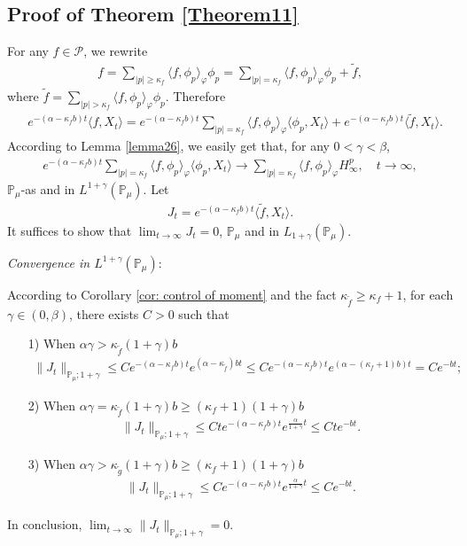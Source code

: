 \documentclass[12pt,oneside,english]{amsart}
\theoremstyle{plain}
\theoremstyle{definition}
\numberwithin{equation}{section}
\begin{document}
\subsection{Proof of Theorem \ref{Theorem11}}
For any $f\in \mathcal{P}$, we rewrite 
\begin{align}
    f=\sum_{|p|\geq \kappa_f}\langle f,\phi_p\rangle_\varphi \phi_p=\sum_{|p|= \kappa_f}\langle f,\phi_p\rangle_\varphi \phi_p+\tilde{f},
\end{align}
where $\tilde{f}=\sum_{|p|> \kappa_f}\langle f,\phi_p\rangle_\varphi \phi_p$. Therefore
\begin{align*}
    &e^{-(\alpha-\kappa_fb)t}\langle f,X_t\rangle=
    e^{-(\alpha-\kappa_fb)t}\sum_{|p|= \kappa_f}\langle f,\phi_p\rangle_\varphi \langle \phi_p,X_t\rangle+e^{-(\alpha-\kappa_fb)t} \langle \tilde{f},X_t\rangle.
\end{align*}
According to Lemma \ref{lemma26}, we easily get that,  for any $0< \gamma<\beta$,
\begin{align}\label{as convergence}
     e^{-(\alpha-\kappa_fb)t}\sum_{|p|= \kappa_f}\langle f,\phi_p\rangle_\varphi \langle \phi_p,X_t\rangle \rightarrow \sum_{|p|=\kappa_f}\langle f, \phi_p\rangle_{\varphi} H_{\infty}^p,  \quad  t\rightarrow \infty,
\end{align}
$\mathbb{P}_{\mu}$-as and in $L^{1+\gamma}(\mathbb{P}_{\mu})$. Let
\begin{align}
    J_t=e^{-(\alpha-\kappa_fb)t}\langle \tilde{f},X_t\rangle.
\end{align}
It suffices to show that $\lim_{t\rightarrow \infty}J_t=0$, $\mathbb{P}_{\mu}$ and in $L_{1+\gamma}(\mathbb{P}_{\mu})$.

{\em Convergence in $L^{1+\gamma}(\mathbb{P}_{\mu})$}:

According to  Corollary \ref{cor: control of moment} and the fact $\kappa_{\tilde{f}}\geq \kappa_f+1$, for each $\gamma\in(0,\beta)$, there exists $C>0$ such that 
\begin{itemize}
    \item [1)] When $\alpha\gamma>\kappa_{\tilde{f}}(1+\gamma)b$
\begin{align*}
    \|J_t\|_{\mathbb{P}_{\mu};1+\gamma}\leq C e^{-(\alpha-\kappa_fb)t}e^{(\alpha-\kappa_{\tilde{f}})bt}\leq C  e^{-(\alpha-\kappa_fb)t}e^{(\alpha-(\kappa_f+1)b)t}=C e^{-bt};
\end{align*}
     \item[2)] When $\alpha\gamma=\kappa_{\tilde{f}}(1+\gamma)b\geq (\kappa_f+1)(1+\gamma)b$
\begin{align*}
     \|J_t\|_{\mathbb{P}_{\mu};1+\gamma}\leq C t e^{-(\alpha-\kappa_fb)t}e^{\frac{\alpha}{1+\gamma}t}\leq C t e^{-bt}.
\end{align*}
     \item[3)] When $\alpha\gamma>\kappa_{\tilde{g}}(1+\gamma)b\geq (\kappa_f+1)(1+\gamma)b$
\begin{align*}
    \|J_t\|_{\mathbb{P}_{\mu};1+\gamma}\leq C e^{-(\alpha-\kappa_fb)t}e^{\frac{\alpha}{1+\gamma}t}\leq C e^{-bt}.
\end{align*}
\end{itemize}
In conclusion, $\lim_{t\rightarrow \infty}\|J_t\|_{\mathbb{P}_{\mu};1+\gamma}=0$.
\end{document}
